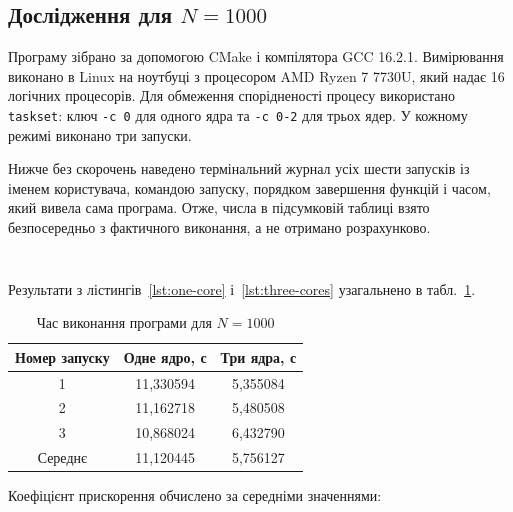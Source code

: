 \documentclass[12pt,a4paper]{article}
\begin{document}
\subsection{Дослідження для \texorpdfstring{\(N=1000\)}{N=1000}}

Програму зібрано за допомогою CMake і компілятора GCC 16.2.1. Вимірювання
виконано в Linux на ноутбуці з процесором AMD Ryzen 7 7730U, який надає 16
логічних процесорів. Для обмеження спорідненості процесу використано
\texttt{taskset}: ключ \texttt{-c 0} для одного ядра та \texttt{-c 0-2}
для трьох ядер. У кожному режимі виконано три запуски.

Нижче без скорочень наведено термінальний журнал усіх шести запусків із
іменем користувача, командою запуску, порядком завершення функцій і часом,
який вивела сама програма. Отже, числа в підсумковій таблиці взято
безпосередньо з фактичного виконання, а не отримано розрахунково.

\begin{listing}[H]
\inputminted[firstline=6,lastline=34]{text}{out.txt}
\caption{Повний журнал трьох запусків на одному ядрі}
\label{lst:one-core}
\end{listing}

\begin{listing}[H]
\inputminted[firstline=36,lastline=64,fontsize=\scriptsize]{text}{out.txt}
\caption{Повний журнал трьох запусків на трьох ядрах}
\label{lst:three-cores}
\end{listing}

Результати з лістингів~\ref{lst:one-core} і~\ref{lst:three-cores}
узагальнено в табл.~\ref{tab:timing}.

\begin{table}[H]
  \centering
  \renewcommand{\arraystretch}{1.2}
  \begin{tabular}{|c|c|c|}
    \hline
    \textbf{Номер запуску} & \textbf{Одне ядро, с} & \textbf{Три ядра, с} \\
    \hline
    1 & 11{,}330594 & 5{,}355084 \\ \hline
    2 & 11{,}162718 & 5{,}480508 \\ \hline
    3 & 10{,}868024 & 6{,}432790 \\ \hline
    Середнє & 11{,}120445 & 5{,}756127 \\ \hline
  \end{tabular}
  \caption{Час виконання програми для \(N=1000\)}
  \label{tab:timing}
\end{table}

Коефіцієнт прискорення обчислено за середніми значеннями:
\end{document}
